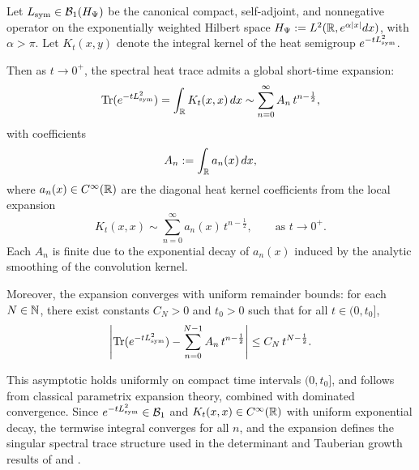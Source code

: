 \begin{proposition}
\label{prop:heat_trace_uniform_conv}
Let \( L_{\mathrm{sym}} \in \mathcal{B}_1(H_{\Psi}) \) be the canonical compact, self-adjoint, and nonnegative operator on the exponentially weighted Hilbert space \( H_{\Psi} := L^2(\mathbb{R}, e^{\alpha|x|} dx) \), with \( \alpha > \pi \). Let \( K_t(x,y) \) denote the integral kernel of the heat semigroup \( e^{-t L_{\mathrm{sym}}^2} \).

Then as \( t \to 0^+ \), the spectral heat trace admits a global short-time expansion:
\[
\operatorname{Tr}(e^{-t L_{\mathrm{sym}}^2}) = \int_{\mathbb{R}} K_t(x,x)\, dx
\sim \sum_{n=0}^\infty A_n\, t^{n - \frac{1}{2}},
\]
with coefficients
\[
A_n := \int_{\mathbb{R}} a_n(x)\, dx,
\]
where \( a_n(x) \in C^\infty(\mathbb{R}) \) are the diagonal heat kernel coefficients from the local expansion
\[
K_t(x,x) \sim \sum_{n=0}^\infty a_n(x)\, t^{n - \frac{1}{2}}, \qquad \text{as } t \to 0^+.
\]
Each \( A_n \) is finite due to the exponential decay of \( a_n(x) \) induced by the analytic smoothing of the convolution kernel.

\medskip
\noindent
Moreover, the expansion converges with uniform remainder bounds: for each \( N \in \mathbb{N} \), there exist constants \( C_N > 0 \) and \( t_0 > 0 \) such that for all \( t \in (0, t_0] \),
\[
\left| \operatorname{Tr}(e^{-t L_{\mathrm{sym}}^2}) - \sum_{n=0}^{N-1} A_n\, t^{n - \frac{1}{2}} \right| \leq C_N\, t^{N - \frac{1}{2}}.
\]

\medskip
\noindent
This asymptotic holds uniformly on compact time intervals \( (0, t_0] \), and follows from classical parametrix expansion theory, combined with dominated convergence. Since \( e^{-t L_{\mathrm{sym}}^2} \in \mathcal{B}_1 \) and \( K_t(x,x) \in C^\infty(\mathbb{R}) \) with uniform exponential decay, the termwise integral converges for all \( n \), and the expansion defines the singular spectral trace structure used in the determinant and Tauberian growth results of  and .
\end{proposition}
